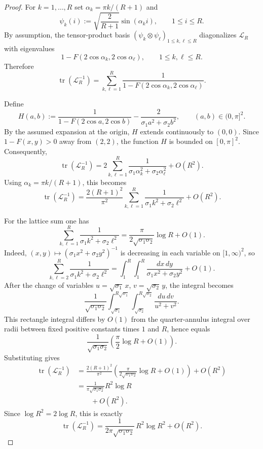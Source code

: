 \documentclass[reqno]{amsart}
\numberwithin{equation}{section}
\theoremstyle{definition}
\theoremstyle{remark}
\DeclareMathOperator{\tr}{tr}
\begin{document}
\begin{proof}
For $k=1,\dots,R$ set $\alpha_k=\pi k/(R+1)$ and
\[
  \psi_k(i):=\sqrt{\frac{2}{R+1}}\sin(\alpha_k i),
  \qquad 1\le i\le R.
\]
By assumption, the tensor-product basis $(\psi_k\otimes\psi_\ell)_{1\le k,\ell\le R}$ diagonalizes $\mathcal L_R$ with eigenvalues
\[
  1-F(2\cos\alpha_k,2\cos\alpha_\ell),
  \qquad 1\le k,\ell\le R.
\]
Therefore
\[
  \tr(\mathcal L_R^{-1})
  =
  \sum_{k,\ell=1}^R
  \frac{1}{1-F(2\cos\alpha_k,2\cos\alpha_\ell)}.
\]

Define
\[
  H(a,b)
  :=
  \frac{1}{1-F(2\cos a,2\cos b)}
  -
  \frac{2}{\sigma_1 a^2+\sigma_2 b^2},
  \qquad (a,b)\in(0,\pi]^2.
\]
By the assumed expansion at the origin, $H$ extends continuously to $(0,0)$. Since $1-F(x,y)>0$ away from $(2,2)$, the function $H$ is bounded on $[0,\pi]^2$. Consequently,
\[
  \tr(\mathcal L_R^{-1})
  =
  2\sum_{k,\ell=1}^R\frac{1}{\sigma_1\alpha_k^2+\sigma_2\alpha_\ell^2}
  + O(R^2).
\]
Using $\alpha_k=\pi k/(R+1)$, this becomes
\[
  \tr(\mathcal L_R^{-1})
  =
  \frac{2(R+1)^2}{\pi^2}
  \sum_{k,\ell=1}^R \frac{1}{\sigma_1 k^2+\sigma_2\ell^2}
  + O(R^2).
\]

For the lattice sum one has
\[
  \sum_{k,\ell=1}^R \frac{1}{\sigma_1 k^2+\sigma_2\ell^2}
  =
  \frac{\pi}{2\sqrt{\sigma_1\sigma_2}}\log R+O(1).
\]
Indeed, $(x,y)\mapsto (\sigma_1 x^2+\sigma_2 y^2)^{-1}$ is decreasing in each variable on $[1,\infty)^2$, so
\[
  \sum_{k,\ell=2}^R \frac{1}{\sigma_1 k^2+\sigma_2\ell^2}
  =
  \int_1^R\!\!\int_1^R \frac{dx\,dy}{\sigma_1 x^2+\sigma_2 y^2}
  + O(1).
\]
After the change of variables $u=\sqrt{\sigma_1}\,x$, $v=\sqrt{\sigma_2}\,y$, the integral becomes
\[
  \frac{1}{\sqrt{\sigma_1\sigma_2}}
  \int_{\sqrt{\sigma_1}}^{R\sqrt{\sigma_1}}
  \int_{\sqrt{\sigma_2}}^{R\sqrt{\sigma_2}}
  \frac{du\,dv}{u^2+v^2}.
\]
This rectangle integral differs by $O(1)$ from the quarter-annulus integral over radii between fixed positive constants times $1$ and $R$, hence equals
\[
  \frac{1}{\sqrt{\sigma_1\sigma_2}}
  \left(\frac{\pi}{2}\log R + O(1)\right).
\]
Substituting gives
\begin{align*}
  \tr(\mathcal L_R^{-1})
  &=
  \frac{2(R+1)^2}{\pi^2}
  \left(
    \frac{\pi}{2\sqrt{\sigma_1\sigma_2}}\log R + O(1)
  \right)
  + O(R^2) \\
  &=
  \frac{1}{\pi\sqrt{\sigma_1\sigma_2}}R^2\log R \\
  &\qquad + O(R^2).
\end{align*}
Since $\log R^2=2\log R$, this is exactly
\[
  \tr(\mathcal L_R^{-1})
  =
  \frac{1}{2\pi\sqrt{\sigma_1\sigma_2}}\,R^2\log R^2 + O(R^2).
\]
\end{proof}
\end{document}
